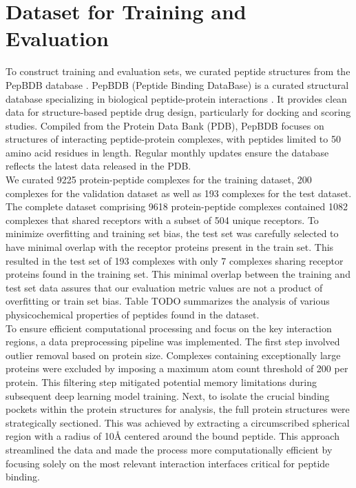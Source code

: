 \section{Dataset for Training and Evaluation}
To construct training and evaluation sets, we curated peptide structures from the PepBDB database \cite{Wen2019}. PepBDB (Peptide Binding DataBase) is a curated structural database specializing in biological peptide-protein interactions \cite{Wen2019}. It provides clean data for structure-based peptide drug design, particularly for docking and scoring studies. Compiled from the Protein Data Bank (PDB), PepBDB focuses on structures of interacting peptide-protein complexes, with peptides limited to 50 amino acid residues in length. Regular monthly updates ensure the database reflects the latest data released in the PDB. \\

We curated 9225 protein-peptide complexes for the training dataset, 200 complexes for the validation dataset as well as 193 complexes for the test dataset. The complete dataset comprising 9618 protein-peptide complexes contained 1082 complexes that shared receptors with a subset of 504 unique receptors. To minimize overfitting and training set bias, the test set was carefully selected to have minimal overlap with the receptor proteins present in the train set. This resulted in the test set of 193 complexes with only 7 complexes sharing receptor proteins found in the training set. This minimal overlap between the training and test set data assures that our evaluation metric values are not a product of overfitting or train set bias. Table TODO summarizes the analysis of various physicochemical properties of peptides found in the dataset. \\

To ensure efficient computational processing and focus on the key interaction regions, a data preprocessing pipeline was implemented. The first step involved outlier removal based on protein size. Complexes containing exceptionally large proteins were excluded by imposing a maximum atom count threshold of 200 per protein. This filtering step mitigated potential memory limitations during subsequent deep learning model training. Next, to isolate the crucial binding pockets within the protein structures for analysis, the full protein structures were strategically sectioned. This was achieved by extracting a circumscribed spherical region with a radius of 10Å centered around the bound peptide. This approach streamlined the data and made the process more computationally efficient by focusing solely on the most relevant interaction interfaces critical for peptide binding. \\

